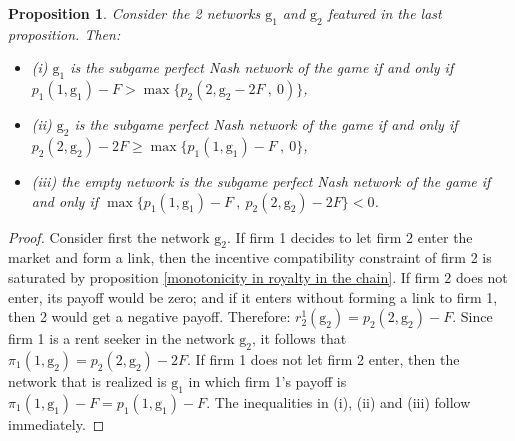 \documentclass{article}
\newtheorem{proposition}{Proposition}
\begin{document}
\begin{proposition}
Consider the 2 networks $\text{g}_1$ and $\text{g}_2$ featured in the last proposition. Then:
\begin{itemize}
\item[] (i) $\text{g}_1$ is the subgame perfect Nash network of the game if and only if $p_1(1,\text{g}_1)-F> \max\{p_2(2,\text{g}_2-2F~,~0)\}$,
\item[] (ii) $\text{g}_2$ is the subgame perfect Nash network of the game if and only if $p_2(2,\text{g}_2)-2F\geq \max\{p_1(1,\text{g}_1)-F~,~0\}$, 
\item[] (iii) the empty network is the subgame perfect Nash network of the game if and only if $\max\{p_1(1,\text{g}_1)-F~,~ p_2(2,\text{g}_2)-2F\}<0$. 
\end{itemize}
\end{proposition} 
\begin{proof}
Consider first the network $\text{g}_2$. If firm 1 decides to let firm $2$ enter the market and form a link, then the incentive compatibility constraint of firm 2 is saturated by proposition \ref{monotonicity in royalty in the chain}. If firm $2$ does not enter, its payoff would be zero; and if it enters without forming a link to firm 1, then 2 would get a negative payoff. Therefore: $r^1_2(\text{g}_2)=p_2(2,\text{g}_2)-F$. Since firm 1 is a rent seeker in the network $\text{g}_2$, it follows that $\pi_1(1,\text{g}_2)=p_2(2,\text{g}_2)-2F$. If firm 1 does not let firm 2 enter, then the network that is realized is $\text{g}_1$ in which firm 1's payoff is $\pi_1(1,\text{g}_1)-F=p_1(1,\text{g}_1)-F$. The inequalities in (i), (ii) and (iii) follow immediately.  
\end{proof}


\end{document}
